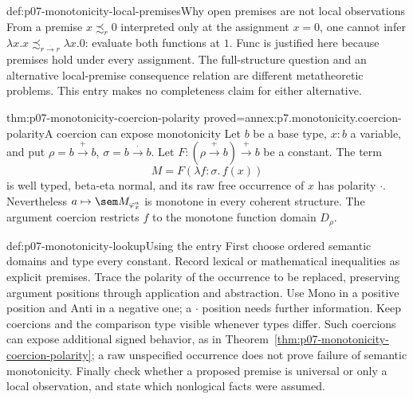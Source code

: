 \begin{hbwarning}{def:p07-monotonicity-local-premises}{Why open premises are not local observations}
From a premise \(x\precsim_r0\) interpreted only at the assignment \(x=0\),
one cannot infer \(\lambda x.x\precsim_{r\xrightarrow{\cdot}r}
\lambda x.0\): evaluate both functions at \(1\).
Func is justified here because premises hold under every assignment.
The full-structure question and an alternative local-premise consequence
relation are different metatheoretic problems. This entry makes no
completeness claim for either alternative.
\end{hbwarning}

\begin{hbtheorem}{thm:p07-monotonicity-coercion-polarity}
 {proved=annex:p7.monotonicity.coercion-polarity}{A coercion can expose monotonicity}
Let \(b\) be a base type, \(x:b\) a variable, and put
\(\rho=b\xrightarrow+b\), \(\sigma=b\xrightarrow{\cdot}b\).
Let \(F:(\rho\xrightarrow+b)\xrightarrow+b\) be a constant.
The term
\[
 M=F(\lambda f:\sigma.\,f(x))
\]
is well typed, beta-eta normal, and its raw free occurrence of \(x\)
has polarity \(\cdot\). Nevertheless
\(a\mapsto\sem M_{\varphi_x^a}\) is monotone in every coherent
structure. The argument coercion restricts \(f\) to the monotone
function domain \(D_\rho\).
\end{hbtheorem}

\begin{hbmethod}{def:p07-monotonicity-lookup}{Using the entry}
First choose ordered semantic domains and type every constant.
Record lexical or mathematical inequalities as explicit premises.
Trace the polarity of the occurrence to be replaced, preserving argument
positions through application and abstraction. Use Mono in a positive
position and Anti in a negative one; a \(\cdot\) position needs further
information. Keep coercions and the comparison type visible whenever types
differ. Such coercions can expose additional signed behavior, as in
Theorem~\ref{thm:p07-monotonicity-coercion-polarity}; a raw unspecified
occurrence does not prove failure of semantic monotonicity.
Finally check whether a proposed premise is universal or only a
local observation, and state which nonlogical facts were assumed.
\end{hbmethod}
